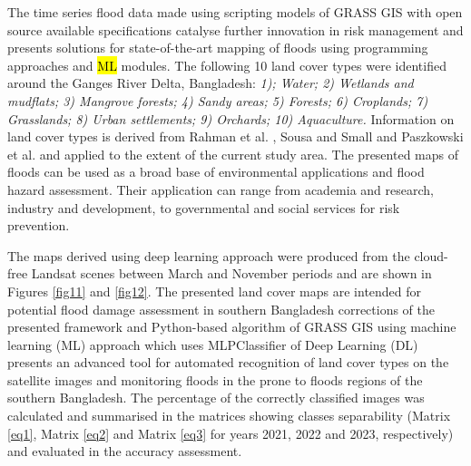 \documentclass[water,article,submit,pdftex,moreauthors]{Definitions/mdpi}
\begin{document}
The time series flood data made using scripting models of GRASS GIS with open source available specifications catalyse further innovation in risk management and presents solutions for state-of-the-art mapping of floods using programming approaches and \hl{ML} modules. The following 10 land cover types were identified around the Ganges River Delta, Bangladesh: \emph{1); Water; 2) Wetlands and mudflats; 3) Mangrove forests; 4) Sandy areas; 5) Forests; 6) Croplands; 7) Grasslands; 8) Urban settlements; 9) Orchards; 10) Aquaculture.} Information on land cover types is derived from Rahman et al. \cite{Rahman2020}, Sousa and Small \cite{rs13234799} and Paszkowski et al. \cite{Paszkowski2021} and applied to the extent of the current study area. The presented maps of floods can be used as a broad base of environmental applications and flood hazard assessment. Their application can range from academia and research, industry and development, to governmental and social services for risk prevention. 

The maps derived using deep learning approach were produced from the cloud-free Landsat scenes between March and November periods and are shown in Figures \ref{fig11} and \ref{fig12}. The presented land cover maps are intended for potential flood damage assessment in southern Bangladesh corrections of the presented framework and Python-based algorithm of GRASS GIS using machine learning (ML) approach which uses MLPClassifier of Deep Learning (DL) presents an advanced tool for automated recognition of land cover types on the satellite images and monitoring floods in the prone to floods regions of the southern Bangladesh. The percentage of the correctly classified images was calculated and summarised in the matrices showing classes separability (Matrix \ref{eq1}, Matrix \ref{eq2} and Matrix \ref{eq3} for years 2021, 2022 and 2023, respectively) and evaluated in the accuracy assessment. 
\end{document}
